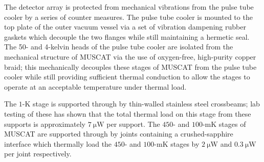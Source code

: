 \documentclass{spie}
\begin{document}
\par 
The detector array is protected from mechanical vibrations from the pulse tube cooler by a series of counter measures. The pulse tube cooler is mounted to the top plate of the outer vacuum vessel via a set of vibration dampening rubber gaskets which decouple the two flanges while still maintaining a hermetic seal. The 50- and 4-kelvin heads of the pulse tube cooler are isolated from the mechanical structure of MUSCAT via the use of oxygen-free, high-purity copper braid; this  mechanically decouples these stages of MUSCAT from the pulse tube cooler while still providing sufficient thermal conduction to allow the stages to operate at an acceptable temperature under thermal load.
\par 
The $1\mbox{-}\si{\kelvin}$ stage is supported through by thin-walled stainless steel crossbeams; lab testing of these has shown that the total thermal load on this stage from these supports is approximately $7~\si{\micro\watt}$ per support.\cite{Brien2018} The $450\mbox{-}$ and $100\mbox{-}\si{\milli\kelvin}$ stages of MUSCAT are supported through by joints containing a crushed-sapphire interface which thermally load the $450\mbox{-}$ and $100\mbox{-}\si{\milli\kelvin}$ stages by $2~\si{\micro\watt}$ and $0.3~\si{\micro\watt}$ per joint respectively.\cite{Brien2018}
\end{document}
